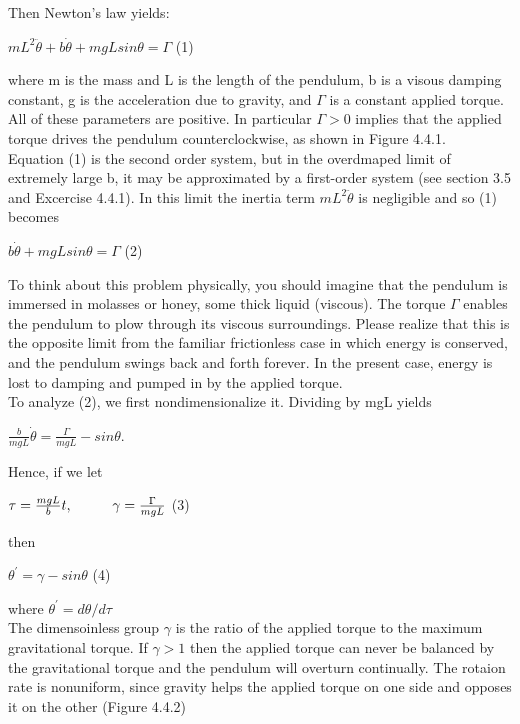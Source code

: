 \documentclass{article}
\newcommand\tab[1][1cm]{\hspace*{#1}}
\begin{document}
Then Newton's law yields:
\begin{center}
$mL^{2}{\ddot{\theta}}+b{\dot{\theta}}+mgLsin\theta = \Gamma$ \tab (1)
\end{center}
where m is the mass and L is the length of the pendulum, b is a visous damping constant, g is the acceleration due to gravity, and $\Gamma$ is a constant applied torque. All of these parameters are positive. In particular $\Gamma > 0$ implies that the applied torque drives the pendulum counterclockwise, as shown in Figure 4.4.1. \\
\tab Equation (1) is the second order system, but in the overdmaped limit of extremely large b, it may be approximated by a first-order system (see section 3.5 and Excercise 4.4.1). In this limit the inertia term 
$mL^{2}\ddot{\theta}$ is negligible and so (1) becomes
\begin{center}
$b \dot{\theta}+mgLsin\theta = \Gamma$ \tab (2)
\end{center}
To think about this problem physically, you should imagine that the pendulum is immersed in molasses or honey, some thick liquid (viscous). The torque $\Gamma$ enables the pendulum to plow through its viscous surroundings. Please realize that this is the opposite limit from the familiar frictionless case in which energy is conserved, and the pendulum swings back and forth forever. In the present case, energy is lost to damping and pumped in by the applied torque. \\
To analyze (2), we first nondimensionalize it. Dividing by mgL yields

\begin{center}
$\frac{b}{mgL}\dot{\theta}=\frac{\Gamma}{mgL}-sin\theta$.
\end{center}
Hence, if we let
\begin{center}
$\tau=\frac{mgL}{b}t, \tab \gamma=\frac{\Gamma}{mgL}$ \tab (3)
\end{center}
then 
\begin{center}
$\theta^{'}=\gamma-sin\theta$ \tab (4)
\end{center}
where $\theta^{'}=d\theta/d\tau$
\\
The dimensoinless group $\gamma$ is the ratio of the applied torque to the maximum gravitational torque. If $\gamma > 1$ then the applied torque can never be balanced by the gravitational torque and the pendulum will overturn continually. The rotaion rate is nonuniform, since gravity helps the applied torque on one side and opposes it on the other (Figure 4.4.2)
\end{document}
